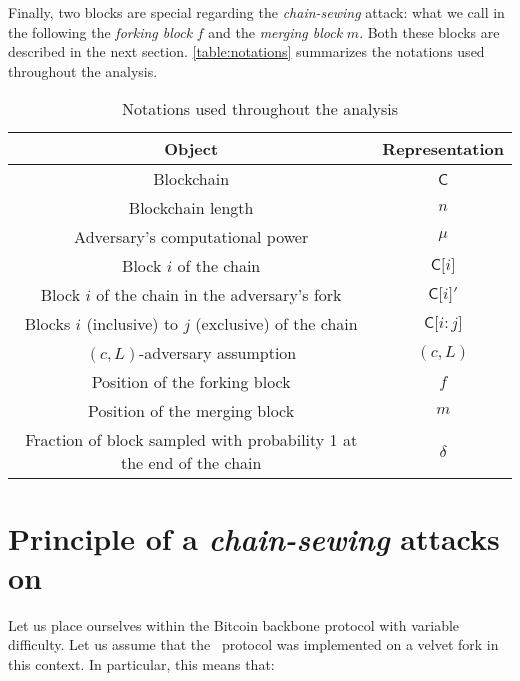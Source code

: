       Finally, two blocks are special regarding the \textit{chain-sewing} attack: what we call in the following the \emph{forking block}  \(f\) and the \emph{merging block} \(m\). Both these blocks are described in the next section. \autoref{table:notations} summarizes the notations used throughout the analysis.

      \begin{table}[ht]
        \centering
        \begin{tabular}{|c|c|}
          \hline
          Object & Representation\\
          \hline
          Blockchain & \(\mathsf{C}\)\\
          \hline
          Blockchain length &  \(n\)\\
          \hline
          Adversary's computational power &  \(\mu\)\\
          \hline
          Block  \(i\) of the chain &  \(\mathsf{C[}i\mathsf{]}\)\\
          \hline
          Block \(i\) of the chain in the adversary's fork & \(\mathsf{C[}i\mathsf{]}'\)\\
          \hline
          Blocks \(i\) (inclusive) to  \(j\) (exclusive) of the chain &  \(\mathsf{C[}i\mathsf{:}j\mathsf{]}\)\\
          \hline
          \((c,L)\)-adversary assumption &  \((c,L)\)\\
          \hline
          Position of the forking block & \(f\)\\
          \hline
          Position of the merging block &  \(m\)\\
          \hline
          Fraction of block sampled with probability 1 at the end of the chain & \(\delta\)\\
          \hline
        \end{tabular}
        \caption{Notations used throughout the analysis}
        \label{table:notations}
      \end{table} 
      
    \section{Principle of a \textit{chain-sewing} attacks on \FC}
      \label{section:attack}
      Let us place ourselves within the Bitcoin backbone protocol with variable difficulty. Let us assume that the \FC\ protocol was implemented on a velvet fork in this context. In particular, this means that:

